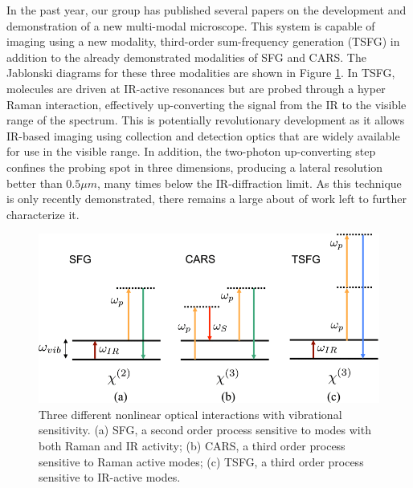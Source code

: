 In the past year, our group has published several papers on the development and demonstration of a new multi-modal microscope.\cite{Hanninen:18}  This system is capable of imaging using a new modality, third-order sum-frequency generation (TSFG) in addition to the already demonstrated modalities of SFG and CARS.  The Jablonski diagrams for these three modalities are shown in Figure \ref{fig:my_tsfg}.  In TSFG, molecules are driven at IR-active resonances but are probed through a hyper Raman interaction, effectively up-converting the signal from the IR to the visible range of the spectrum.  This is potentially revolutionary development as it allows IR-based imaging using collection and detection optics that are widely available for use in the visible range. In addition, the two-photon up-converting step confines the probing spot in three dimensions, producing a lateral resolution better than $0.5 \mu m$, many times below the IR-diffraction limit.  As this technique is only recently demonstrated, there remains a large about of work left to further characterize it.  

\begin{figure}
    \centering
    \includegraphics[width=\linewidth]{Figures/tsfg.png}
    \caption{Three different nonlinear optical interactions with vibrational sensitivity. (a) SFG, a second order process sensitive to modes with both Raman and IR activity; (b) CARS, a third order process sensitive to Raman active modes; (c) TSFG, a third order process sensitive to IR-active modes.}
    \label{fig:my_tsfg}
\end{figure}

